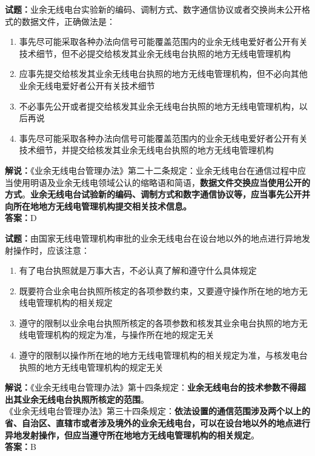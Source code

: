 \documentclass{ctexbook}
\begin{document}
\noindent\textbf{试题：}业余无线电台实验新的编码、调制方式、数字通信协议或者交换尚未公开格式的数据文件，正确做法是：
\begin{enumerate}[leftmargin=3em]
\item 事先尽可能采取各种办法向信号可能覆盖范围内的业余无线电爱好者公开有关技术细节，但不必提交给核发其业余无线电台执照的地方无线电管理机构
\item 应事先提交给核发其业余无线电台执照的地方无线电管理机构，但不必向其他业余无线电爱好者公开有关技术细节
\item 不必事先公开或者提交给核发其业余无线电台执照的地方无线电管理机构，以后再说
\item 事先尽可能采取各种办法向信号可能覆盖范围内的业余无线电爱好者公开有关技术细节，并提交给核发其业余无线电台执照的地方无线电管理机构
\end{enumerate}
\noindent\textbf{解说：}《业余无线电台管理办法》第二十二条规定：业余无线电台在通信过程中应当使用明语及业余无线电领域公认的缩略语和简语，\textbf{数据文件交换应当使用公开的方式}。\textbf{业余无线电台试验新的编码、调制方式和数字通信协议等，应当事先公开并向所在地地方无线电管理机构提交相关技术信息。}\\\noindent\textbf{答案：}D




\bigskip


\noindent\textbf{试题：}由国家无线电管理机构审批的业余无线电台在设台地以外的地点进行异地发射操作时，应该注意：
\begin{enumerate}[leftmargin=3em]
\item 有了电台执照就是万事大吉，不必认真了解和遵守什么具体规定
\item 既要符合业余电台执照所核定的各项参数约束，又要遵守操作所在地的地方无线电管理机构的相关规定
\item 遵守的限制以业余电台执照所核定的各项参数和核发其业余电台执照的地方无线电管理机构的规定为准，与操作所在地的规定无关
\item 遵守的限制以操作所在地的地方无线电管理机构的相关规定为准，与核发电台执照的地方无线电管理机构的规定无关
\end{enumerate}
\noindent\textbf{解说：}《业余无线电台管理办法》第十四条规定：\textbf{业余无线电台的技术参数不得超出其业余无线电台执照所核定的范围}。\\
《业余无线电台管理办法》第三十四条规定：\textbf{依法设置的通信范围涉及两个以上的省、自治区、直辖市或者涉及境外的业余无线电台，可以在设台地以外的地点进行异地发射操作，但应当遵守所在地地方无线电管理机构的相关规定}。\\\noindent\textbf{答案：}B
\end{document}
